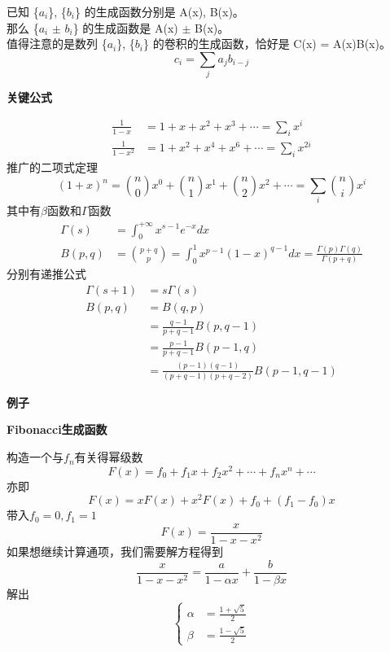 \documentclass[10pt]{ctexart}
\begin{document}
{{已知 \{$a_i$\}, \{$b_i$\} 的生成函数分别是 A(x), B(x)。\\
那么 \{$a_i$ $\pm$ $b_i$\} 的生成函数是 A(x) $\pm$ B(x)。 \\
值得注意的是数列 \{$a_i$\}, \{$b_i$\} 的卷积的生成函数，恰好是 C(x) = A(x)B(x)。\\
$$
c_i = \sum_j a_jb_{i-j}
$$
{\large\bfseries 关键公式\par}
\begin{equation*}
\begin{aligned}
    \frac{1}{1-x} &= 1 + x + x^2 + x^3 + \cdots = \sum_{i}x^i\\
    \frac{1}{1-x^2} &= 1+x^2+x^4+x^6+\cdots=\sum_i x^{2i}
\end{aligned}
\end{equation*}
推广的二项式定理\\
$$
(1+x)^n = \binom n0 x^0 + \binom n1 x^1 + \binom n2 x^2 + \cdots = \sum_i \binom ni x^i
$$
其中有$\beta$函数和$\Gamma$函数
$$
\begin{aligned}
\Gamma(s) &= \int_0^{+\infty} x^{s-1} e^{-x} dx\\
B(p, q) &= \binom {p + q}{p} = \int_0^1 x^{p-1}(1-x)^{q-1}dx =\frac{\Gamma(p) \Gamma(q)}{\Gamma(p+q)}
\end{aligned}
$$
分别有递推公式
$$
\begin{aligned}
\Gamma(s + 1) &= s \Gamma(s) \\
B(p, q) &= B(q, p) \\
&= \frac{q - 1}{p + q - 1} B(p, q - 1)\\
&= \frac{p - 1}{p + q - 1} B(p - 1, q)\\
&= \frac{(p - 1)(q - 1)}{(p + q - 1)(p + q - 2)} B(p - 1, q - 1)
\end{aligned}
$$
{\large\bfseries 例子\par}
{\large\bfseries Fibonacci生成函数\par}
构造一个与${f_n}$有关得幂级数\\
$$
F(x) = f_0 + f_1x +f_2x^2 + \cdots + f_n x^n + \cdots
$$
亦即
$$
F(x) = xF(x) + x^2F(x) + f_0 + (f_1 - f_0)x
$$
带入$f_0=0,f_1=1$\\
$$
F(x) = \frac{x}{1-x-x^2}
$$
如果想继续计算通项，我们需要解方程得到\\
$$
\frac{x}{1-x-x^2} = \frac{a}{1-\alpha x} + \frac{b}{1-\beta x}
$$
解出
$$
\left\{
\begin{aligned}
\alpha &= \frac{1+\sqrt5}{2} \\
\beta &= \frac{1-\sqrt5}{2}
\end{aligned}
\right.
$$}}
\end{document}
